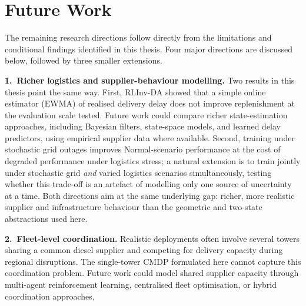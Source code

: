 \section{Future Work}
\label{sec:conclusion_future}
The remaining research directions follow directly from the
limitations and conditional findings identified in this thesis. Four
major directions are discussed below, followed by three smaller
extensions.

\textbf{1.\ Richer logistics and supplier-behaviour modelling.} Two
results in this thesis point the same way. First, RLInv-DA showed that
a simple online estimator (EWMA) of realised delivery delay does not
improve replenishment at the evaluation scale tested. Future work could
compare richer state-estimation approaches, including Bayesian filters,
state-space models, and learned delay predictors, using empirical
supplier data where available.
Second, training under stochastic grid outages improves Normal-scenario
performance at the cost of degraded performance under logistics stress;
a natural extension is to train jointly under stochastic grid
\emph{and} varied logistics scenarios simultaneously, testing whether
this trade-off is an artefact of modelling only one source of
uncertainty at a time. Both directions aim at the same underlying gap:
richer, more realistic supplier and infrastructure behaviour than the
geometric and two-state abstractions used here.

\textbf{2.\ Fleet-level coordination.} Realistic
deployments often involve several towers sharing a common diesel
supplier and competing for delivery capacity during regional
disruptions. The single-tower CMDP formulated here cannot capture this
coordination problem. Future work could model shared supplier capacity
through multi-agent reinforcement learning, centralised fleet
optimisation, or hybrid coordination approaches, 

